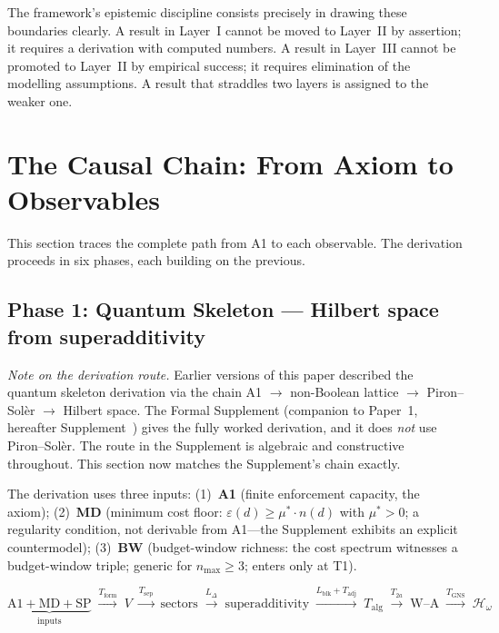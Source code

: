 \documentclass[11pt]{article}
\begin{document}
The framework's epistemic discipline consists precisely in drawing these boundaries clearly.  A result in Layer~I cannot be moved to Layer~II by assertion; it requires a derivation with computed numbers.  A result in Layer~III cannot be promoted to Layer~II by empirical success; it requires elimination of the modelling assumptions.  A result that straddles two layers is assigned to the weaker one.


\section{The Causal Chain: From Axiom to Observables}
\label{sec:causal}

This section traces the complete path from A1 to each observable.  The derivation proceeds in six phases, each building on the previous.

\subsection{Phase 1: Quantum Skeleton --- Hilbert space from superadditivity}

\textit{Note on the derivation route.}  Earlier versions of this paper described the quantum skeleton derivation via the chain A1 $\to$ non-Boolean lattice $\to$ Piron--Sol\`er $\to$ Hilbert space.  The Formal Supplement (companion to Paper~1, hereafter Supplement~\cite{Supp}) gives the fully worked derivation, and it does \emph{not} use Piron--Sol\`er.  The route in the Supplement is algebraic and constructive throughout.  This section now matches the Supplement's chain exactly.

The derivation uses three inputs: (1)~\textbf{A1} (finite enforcement capacity, the axiom); (2)~\textbf{MD} (minimum cost floor: $\varepsilon(d) \ge \mu^* \cdot n(d)$ with $\mu^* > 0$; a regularity condition, not derivable from A1---the Supplement exhibits an explicit countermodel); (3)~\textbf{BW} (budget-window richness: the cost spectrum witnesses a budget-window triple; generic for $n_{\max} \ge 3$; enters only at T1).

\begin{equation}
\underbrace{\text{A1} + \text{MD} + \text{SP}}_{\text{inputs}} \;\xrightarrow{T_{\mathrm{form}}}\; V \;\xrightarrow{T_{\mathrm{sep}}}\; \text{sectors} \;\xrightarrow{L_\Delta}\; \text{superadditivity} \;\xrightarrow{L_{\mathrm{blk}} + T_{\mathrm{adj}}}\; T_{\mathrm{alg}} \;\xrightarrow{T_{2a}}\; \text{W--A} \;\xrightarrow{T_{\mathrm{GNS}}}\; \mathcal{H}_\omega
\end{equation}
\end{document}
